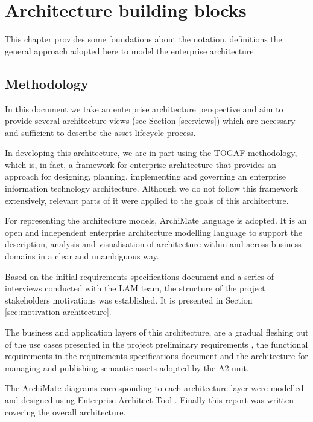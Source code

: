 \chapter{Architecture building blocks}
\label{sec:building-blocks}

	This chapter provides some foundations about the notation, definitions the general approach adopted here to model the enterprise architecture.

	\section{Methodology}
	
	In this document we take an enterprise architecture perspective and aim to provide several architecture views (see Section \ref{sec:views}) which are necessary and sufficient to describe the asset lifecycle process. 
	
	In developing this architecture, we are in part using the TOGAF \citep{togaf9.2} methodology, which is, in fact, a framework for enterprise architecture that provides an approach for designing, planning, implementing and governing an enterprise information technology architecture. Although we do not follow this framework extensively, relevant parts of it were applied to the goals of this architecture.
		
	For representing the architecture models, ArchiMate language \citep{archimate3.1} is adopted. It is an open and independent enterprise architecture modelling language to support the description, analysis and visualisation of architecture within and across business domains in a clear and unambiguous way.

	Based on the initial requirements specifications document \citep{lam-requirements-2020} and a series of interviews conducted with the LAM team, the structure of the project stakeholders motivations was established. It is presented in Section \ref{sec:motivation-architecture}.
		 
	The business and application layers of this architecture, are a gradual fleshing out of the use cases presented in the project preliminary requirements \citep{lam-preliminary-requirements-2019}, the functional requirements in the requirements specifications document \citep{lam-requirements-2020} and the architecture for managing and publishing semantic assets \citep{costetchi2020d} adopted by the A2 unit.
	 
	The ArchiMate diagrams corresponding to each architecture layer were modelled and designed using Enterprise Architect Tool \citep{ea}. Finally this report was written covering the overall architecture. 
	
